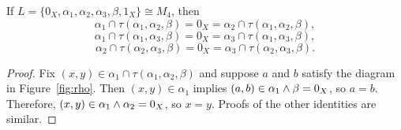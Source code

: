 \begin{fact} If 
$L = \{0_X, \alpha_1, \alpha_2, \alpha_3, \beta, 1_X\} \cong  M_4$,
then
  \[
\alpha_1 \cap \tau(\alpha_1, \alpha_2, \beta)
= 0_X =  \alpha_2 \cap \tau(\alpha_1, \alpha_2, \beta),
\]
\[
\alpha_1 \cap \tau(\alpha_1, \alpha_3, \beta)
= 0_X =  \alpha_3 \cap \tau(\alpha_1, \alpha_3, \beta),
\]
\[
\alpha_2 \cap \tau(\alpha_2, \alpha_3, \beta)
 = 0_X = \alpha_3 \cap \tau(\alpha_2, \alpha_3, \beta).
\]
\end{fact}
\begin{proof}
  Fix $(x,y) \in  \alpha_1 \cap \tau(\alpha_1, \alpha_2, \beta)$ and suppose 
  $a$ and $b$ satisfy the diagram in Figure~\ref{fig:rho}.  Then 
  $(x,y) \in \alpha_1$ implies $(a, b)\in \alpha_1 \wedge \beta = 0_X$, so 
  $a = b$.  Therefore, $(x,y) \in \alpha_1 \wedge \alpha_2 = 0_X$, so $x = y$.
  Proofs of the other identities are similar.
\end{proof}

